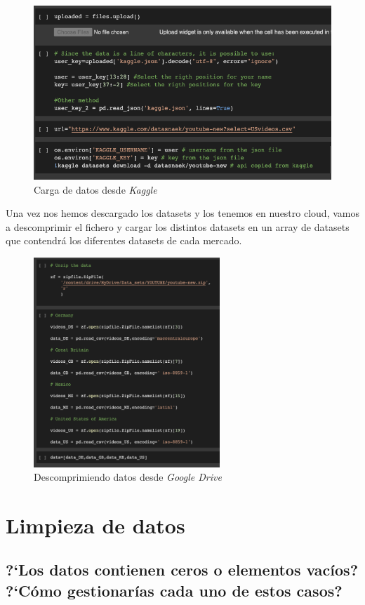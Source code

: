 \documentclass[a4paper,12pt]{article}
\begin{document}
\begin{figure}[h!]
 \centering
\includegraphics[width=13cm]{kaggle_upload.png}
\caption{Carga de datos desde {\itshape Kaggle}}
\label{fig:carga}
\end{figure}


Una vez nos hemos descargado los datasets y los tenemos en nuestro cloud, vamos a descomprimir el fichero y cargar los distintos datasets en un array de datasets que contendr\'a los diferentes datasets de cada mercado.
\begin{figure}[h!]
\centering
\includegraphics[width=7cm]{data_load.png}
\caption{Descomprimiendo datos desde {\itshape Google Drive}}
\label{fig:desc}
\end{figure}

\section[item_limpieza]{Limpieza de datos}

\subsection{?`Los datos contienen ceros o elementos vac\'ios? ?`C\'omo gestionar\'ias cada uno de estos casos?}
\end{document}
